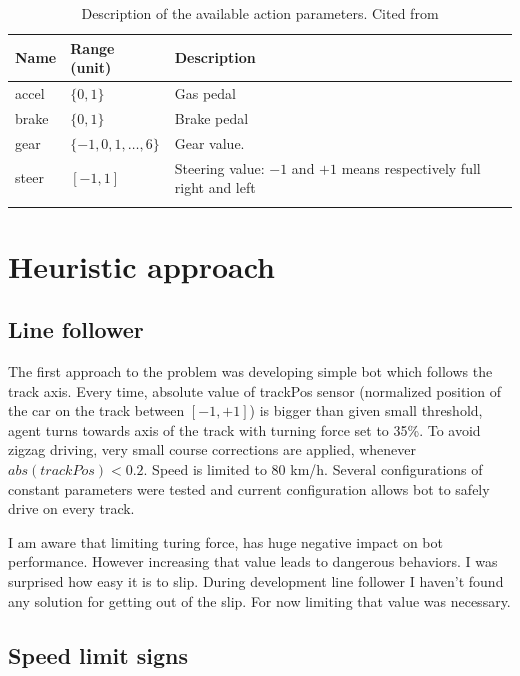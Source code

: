 \documentclass[declaration,shortabstract,english,inz]{iithesis}
\begin{document}
\begin{center}
    \begin{longtable}{ | p{} |p{}| p{} |}
    \hline
    \textbf{Name} & \textbf{Range (unit)} & \textbf{Description}  \\ 
    \hline
    accel & $\{0,1\}$ & Gas pedal \\ 
     \hline
     brake &  $\{0,1\}$ & Brake pedal \\ 
     \hline
     gear & $\{-1,0,1,\dots ,6\}$ & Gear value. \\ 
     \hline
     steer &  $[-1,1]$ & Steering value: $-1$ and $+1$ means respectively full right and
     left \\ 
     \hline
     \caption{\label{tab:torcs_actions}Description of the available  action parameters. Cited from \cite{scrc_manual}}
    \end{longtable}
\end{center}

\chapter{Heuristic approach}

\section{Line follower}

The first approach to the problem was developing simple bot which follows the track axis. Every time, absolute value of trackPos sensor (normalized position of the car on the track between $[-1, +1]$) is bigger than given small threshold, agent turns towards axis of the track with turning force set to 35\%. To avoid zigzag driving, very small course corrections are applied, whenever $abs(trackPos) < 0.2$. Speed is limited to 80 km/h. Several configurations of constant parameters were tested and current configuration allows bot to safely drive on every track. 

I am aware that limiting turing force, has huge negative impact on bot performance. However increasing that value leads to dangerous behaviors. I was surprised how easy it is to slip. During development line follower I haven't found any solution for getting out of the slip. For now limiting that value was necessary.

\section{Speed limit signs}
\end{document}
